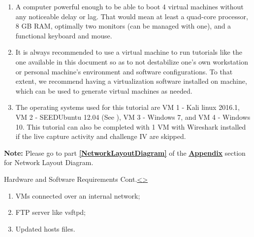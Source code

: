 \documentclass[12pt]{extarticle}
\newenvironment{instructionblock}{\Large\bgroup}{\egroup}
\newcommand{\ben}{\begin{enumerate}}
\newcommand{\een}{\end{enumerate}}
\begin{document}
	\ben
	\item A computer powerful enough to be able to boot 4 virtual machines without any noticeable delay or lag. That would mean at least a quad-core processor, 8 GB RAM, optimally two monitors (can be managed with one), and a functional keyboard and mouse.
	
	\item It is always recommended to use a virtual machine to run tutorials like the one available in this document so as to not destabilize one's own workstation or personal machine's environment and software configurations. To that extent, we recommend having a virtualization software installed on machine, which can be used to generate virtual machines as needed. 
	
	\item The operating systems used for this tutorial are VM 1 - Kali linux 2016.1, VM 2 - SEEDUbuntu 12.04 (See \cite{seed_lab_vm}), VM 3 - Windows 7, and VM 4 - Windows 10. This tutorial can also be completed with 1 VM with Wireshark installed if the live capture activity and challenge IV are skipped.
	
	\een
	
	\vfill
	\textbf{Note:} Please go to part \textbf{\underline{\ref{NetworkLayoutDiagram}}} of the {\textbf{\hyperref[slide 36]{\underline{Appendix}}}} section for Network Layout Diagram.
	
	
	
	\pagebreak
	\begin{slide}{Hardware and Software Requirements Cont.}{\hyperref[slide 3]{\textless}\hyperref[slide 5]{\textgreater}}
		\begin{instructionblock}
			\begin{enumerate}
				\item VMs connected over an internal network;
				\item FTP server like vsftpd;
				\item Updated hosts files.
			\end{enumerate}
		\end{instructionblock}
	\end{slide}
	
\end{document}
